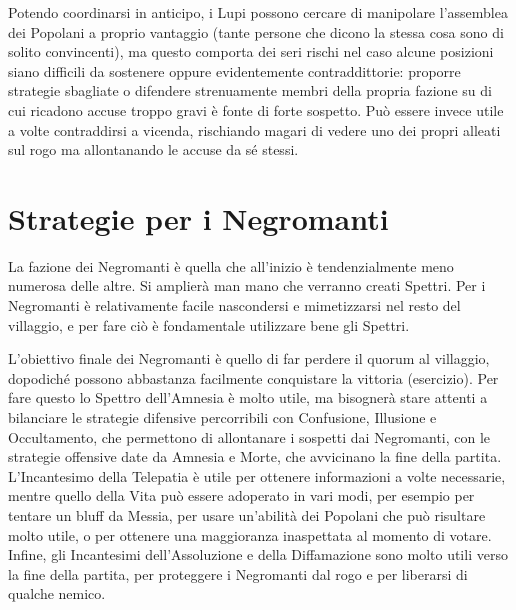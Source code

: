 \documentclass[a4paper,10pt]{article}
\begin{document}
Potendo coordinarsi in anticipo, i Lupi possono cercare di manipolare l'assemblea dei Popolani a proprio vantaggio (tante persone che dicono la stessa cosa sono di solito convincenti), ma questo comporta dei seri rischi nel caso alcune posizioni siano difficili da sostenere oppure evidentemente contraddittorie: proporre strategie sbagliate o difendere strenuamente membri della propria fazione su di cui ricadono accuse troppo gravi è fonte di forte sospetto. Può essere invece utile a volte contraddirsi a vicenda, rischiando magari di vedere uno dei propri alleati sul rogo ma allontanando le accuse da sé stessi.

\section{Strategie per i Negromanti}

La fazione dei Negromanti è quella che all'inizio è tendenzialmente meno numerosa delle altre. Si amplierà man mano che verranno creati Spettri. Per i Negromanti è relativamente facile nascondersi e mimetizzarsi nel resto del villaggio, e per fare ciò è fondamentale utilizzare bene gli Spettri.

L'obiettivo finale dei Negromanti è quello di far perdere il quorum al villaggio, dopodiché possono abbastanza facilmente conquistare la vittoria (esercizio). Per fare questo lo Spettro dell'Amnesia è molto utile, ma bisognerà stare attenti a bilanciare le strategie difensive percorribili con Confusione, Illusione e Occultamento, che permettono di allontanare i sospetti dai Negromanti, con le strategie offensive date da Amnesia e Morte, che avvicinano la fine della partita. L'Incantesimo della Telepatia è utile per ottenere informazioni a volte necessarie, mentre quello della Vita può essere adoperato in vari modi, per esempio per tentare un bluff da Messia, per usare un'abilità dei Popolani che può risultare molto utile, o per ottenere una maggioranza inaspettata al momento di votare. Infine, gli Incantesimi dell'Assoluzione e della Diffamazione sono molto utili verso la fine della partita, per proteggere i Negromanti dal rogo e per liberarsi di qualche nemico.
\end{document}

